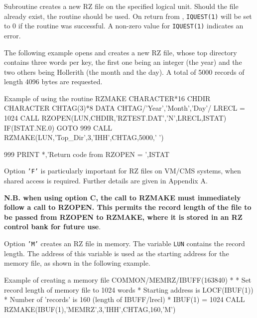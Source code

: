 Subroutine  creates a new RZ file on the specified
logical unit. Should the file already exist, the routine
 should be used.
On return from , {\tt IQUEST(1)}
will be set to 0
if the routine was successful. A non-zero value for
{\tt IQUEST(1)} indicates an error.

The following example opens and creates a new RZ file,
whose top directory contains
three words per key, the first one being an integer (the year) and the
two others being Hollerith (the month and the day).
A total of 5000 records of length 4096 bytes are requested.

\begin{XMPt}{Example of using the routine RZMAKE}
      CHARACTER*16 CHDIR
      CHARACTER    CHTAG(3)*8
      DATA CHTAG/'Year','Month','Day'/
      LRECL = 1024
      CALL RZOPEN(LUN,CHDIR,'RZTEST.DAT','N',LRECL,ISTAT)
      IF(ISTAT.NE.0) GOTO 999
      CALL RZMAKE(LUN,'Top_Dir',3,'IHH',CHTAG,5000,' ')
 
  999 PRINT *,'Return code from RZOPEN = ',ISTAT
\end{XMPt}

Option {\tt'F'} is particularly important for RZ files on
VM/CMS systems, when shared access is required. Further
details are given in Appendix A.

{\bf N.B. when using option C, the call to RZMAKE must 
immediately follow a call to RZOPEN. This permits the
record length of the file to be passed from RZOPEN to RZMAKE,
where it is stored in an RZ control bank for future use}.

Option {\tt'M'} creates an RZ file in memory. The
variable {\tt LUN} contains the record length.
The address of this variable is used as the starting
address for the memory file, as shown in the following example.
\begin{XMPt}{Example of creating a memory file}
      COMMON/MEMRZ/IBUFF(163840)
*
*     Set record length of memory file to 1024 words
*     Starting address is LOCF(IBUF(1))
*     Number of 'records' is 160 (length of IBUFF/lrecl)
*
      IBUF(1) = 1024
      CALL RZMAKE(IBUF(1),'MEMRZ',3,'IHH',CHTAG,160,'M')
\end{XMPt}



